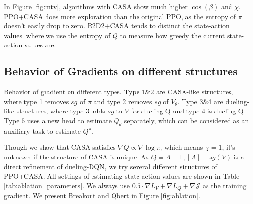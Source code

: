 In Figure \ref{fig:mtv}, algorithms with CASA show much higher $\cos(\beta)$ and $\chi$. 
PPO+CASA does more exploration than the original PPO, as the entropy of $\pi$ doesn't easily drop to zero. 
R2D2+CASA tends to distinct the state-action values, where we use the entropy of $Q$ to measure how greedy the current state-action values are. %

\subsection{Behavior of Gradients on different structures}
\label{sec:ablation}

\begin{table}[ht!]
\centering
\begin{minipage}[b]{0.4\textwidth}
\end{minipage}\hfill
\begin{minipage}[c]{0.56\textwidth}
\setlength{\abovecaptionskip}{0pt}%
\caption{\small Behavior of gradient on different types. Type 1$\&$2 are CASA-like structures, where type 1 removes $sg$ of $\pi$ and type 2 removes $sg$ of $V_\theta$. Type 3$\&$4 are dueling-like structures, where type 3 adds $sg$ to $V$ for dueling-Q and type 4 is dueling-Q. Type 5 uses a new head to estimate $Q_\theta$ separately, which can be considered as an auxiliary task to estimate $Q^\pi$. }
\label{tab:ablation_parameters}
\end{minipage}
\end{table}

Though we show that CASA satisfies $\nabla Q \propto \nabla \log \pi$, { which means $\chi = 1$}, it's unknown if the structure of CASA is unique. 
As $Q = A - \mathbb{E}_\pi[A] + sg(V)$ is a direct refinement of dueling-DQN, we try several different structures of PPO+CASA. 
All settings of estimating state-action values are shown in Table \ref{tab:ablation_parameters}. 
We always use $0.5 \cdot \nabla L_V + \nabla L_Q + \nabla \mathcal{J}$ as the training gradient. 
We present Breakout and Qbert in Figure \ref{fig:ablation}.


